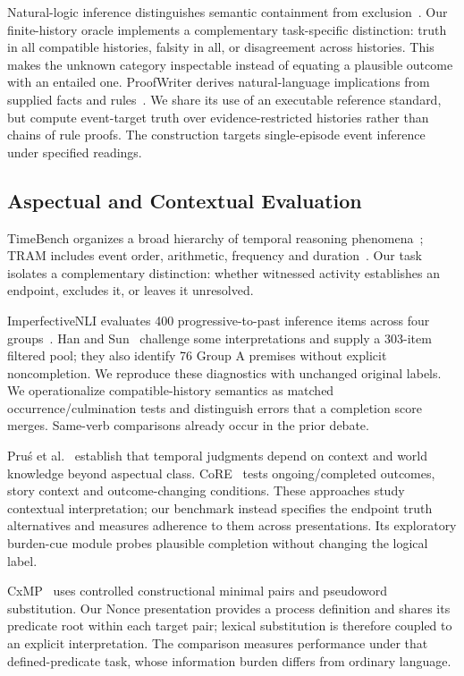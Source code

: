 \documentclass[sigconf,anonymous,review]{acmart}
\begin{document}
Natural-logic inference distinguishes semantic containment from exclusion~\cite{maccartney2008}. Our finite-history oracle implements a complementary task-specific distinction: truth in all compatible histories, falsity in all, or disagreement across histories. This makes the unknown category inspectable instead of equating a plausible outcome with an entailed one. ProofWriter derives natural-language implications from supplied facts and rules~\cite{proofwriter2021}. We share its use of an executable reference standard, but compute event-target truth over evidence-restricted histories rather than chains of rule proofs. The construction targets single-episode event inference under specified readings.

\subsection{Aspectual and Contextual Evaluation}
TimeBench organizes a broad hierarchy of temporal reasoning phenomena~\cite{timebench2024}; TRAM includes event order, arithmetic, frequency and duration~\cite{tram2024}. Our task isolates a complementary distinction: whether witnessed activity establishes an endpoint, excludes it, or leaves it unresolved.

ImperfectiveNLI evaluates 400 progressive-to-past inference items across four groups~\cite{ma2026}. Han and Sun~\cite{han2026} challenge some interpretations and supply a 303-item filtered pool; they also identify 76 Group A premises without explicit noncompletion. We reproduce these diagnostics with unchanged original labels. We operationalize compatible-history semantics as matched occurrence/culmination tests and distinguish errors that a completion score merges. Same-verb comparisons already occur in the prior debate.

Pru\'{s} et al.~\cite{prus2024,prus2025} establish that temporal judgments depend on context and world knowledge beyond aspectual class. CoRE~\cite{core2025} tests ongoing/completed outcomes, story context and outcome-changing conditions. These approaches study contextual interpretation; our benchmark instead specifies the endpoint truth alternatives and measures adherence to them across presentations. Its exploratory burden-cue module probes plausible completion without changing the logical label.

CxMP~\cite{cxmp2026} uses controlled constructional minimal pairs and pseudoword substitution. Our Nonce presentation provides a process definition and shares its predicate root within each target pair; lexical substitution is therefore coupled to an explicit interpretation. The comparison measures performance under that defined-predicate task, whose information burden differs from ordinary language.
\end{document}
